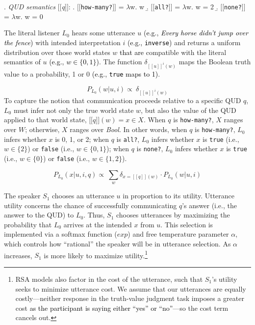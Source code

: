 \documentclass[cm]{glossa}
\newcommand{\sem}[1]{\mbox{$[\![$#1$]\!]$}}
\newcommand{\lam}{\ensuremath{\lambda}}
\newcommand{\lp}[1]{\textcolor{black}{#1}} %
\begin{document}
\ex. \label{ex:qud-sem1} \emph{QUD semantics} \sem{\textit{q}}:
\a. \sem{\texttt{how-many?}} = \lam w. w
\b. \sem{\texttt{all?}} = \lam w. w = 2
\b. \sem{\texttt{none?}} = \lam w. w = 0


The literal listener $L_0$ hears some utterance $u$ 
\lp{(e.g., \textit{Every horse didn't jump over the fence})}
with intended interpretation $i$ 
\lp{(e.g., \texttt{inverse})}
and returns a uniform distribution over those world states $w$ \lp{that are} compatible with the literal semantics of $u$
\lp{(e.g., $w \in \{0,1\}$)}.
 The function $\delta_{[\![u]\!]^{i}(w)}$ maps the Boolean truth value to a probability, 1 or 0
\lp{(e.g., \texttt{true} maps to 1)}.

\begin{equation*}
P_{L_{0}} (w | u, i) \propto \ \delta_{[\![u]\!]^{i}(w)}
\end{equation*}
To capture the notion that communication proceeds relative to a specific QUD $q$, $L_0$ must infer not only the true world state $w$, but also the value of the QUD applied to that world state, $\sem{$q$}(w) = x \in X$. When $q$ is \texttt{how-many?}, $X$ ranges over $W$; otherwise, $X$ ranges over \emph{Bool}. In other words, when $q$ is \texttt{how-many?}, $L_0$ infers whether $x$ is 0, 1, or 2; when $q$ is \texttt{all?}, $L_0$ infers whether $x$ is \texttt{true} (i.e., $w \in \{2\}$) or \texttt{false} (i.e., $w \in \{0, 1\}$); when $q$ is \texttt{none?}, $L_0$ infers whether $x$ is \texttt{true} (i.e., $w \in \{0\}$) or \texttt{false} (i.e., $w \in \{1, 2\}$).

\begin{equation*}
P_{L_{0}} (x | u, i, q) \propto \ \sum_{w}\delta_{x=[\! [ q ]\! ](w)} \cdot P_{L_{0}} (w | u, i)
\end{equation*}

The speaker $S_1$ chooses an utterance $u$ in proportion to its utility. Utterance utility concerns the chance of successfully communicating $q$'s answer (i.e., the answer to the QUD) to $L_0$. Thus, $S_1$ chooses utterances by maximizing the probability that $L_0$ arrives at the intended $x$ from $u$. This selection is implemented via a softmax function ($exp$) and free temperature parameter $\alpha$, which controls how ``rational'' the speaker will be in utterance selection. As $\alpha$ increases, $S_1$ is more likely to maximize utility.\footnote{RSA models also factor in the cost of the utterance, such that $S_1$'s utility seeks to minimize utterance cost. We assume that our utterances are equally costly---neither response in the truth-value judgment task imposes a greater cost \lp{as the participant is saying either ``yes'' or ``no''}---so the cost term cancels out.} 
\end{document}
